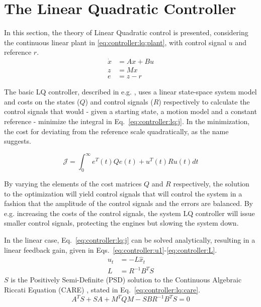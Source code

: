 \section{The Linear Quadratic Controller}
\label{sec:controller:lq}
    In this section, the theory of Linear Quadratic control is presented,
    considering the continuous linear plant in \eqref{eq:controller:lq:plant},
    with control signal $u$ and reference $r$.
    \begin{subequations}
        \label{eq:controller:lq:plant}
        \begin{align}
            \dot{x} &= Ax + Bu \\
%
            z &= Mx \\
%
            e &= z - r
        \end{align}
    \end{subequations}

    The basic LQ controller, described in e.g. \citep{glad2003reglerteori},
    uses a linear state-space system model and costs on the states ($Q$) and control
    signals ($R$) respectively to calculate the control signals that would
    - given a starting state, a motion model and a constant reference -
    minimize the integral in Eq.~\eqref{eq:controller:lq:j}.
    In the minimization, the cost for deviating from the reference scale
    quadratically, as the name suggests.

    \begin{equation}
    \label{eq:controller:lq:j}
        \mathcal{J} = \int_{0}^{\infty} e^{T}(t)Qe(t) + u^{T}(t)Ru(t) dt
    \end{equation}

    By varying the elements of the cost matrices $Q$ and $R$
    respectively, the solution to the optimization will yield control
    signals that will control the system in a fashion that the amplitude
    of the control signals and the errors are balanced.
    By e.g. increasing the costs of the control signals, the system
    LQ controller will issue smaller control signals, protecting the
    engines but slowing the system down.

    In the linear case, Eq.~\eqref{eq:controller:lq:j} can be solved analytically,
    resulting in a linear feedback gain, given in Eqs.~\eqref{eq:controller:u1}-\eqref{eq:controller:L}.
    \begin{align}
        u_{t} &= -L\hat{x}_{t} \label{eq:controller:u1} \\
%
        L &= R^{-1}B^{T}S \label{eq:controller:L}
    \end{align}
    $S$ is the Positively Semi-Definite (PSD) solution to the
    Continuous Algebraic Riccati Equation (CARE) \citep{glad2003reglerteori},
    stated in Eq.~\eqref{eq:controller:lq:care}.
    \begin{equation}
        \label{eq:controller:lq:care}
        A^{T}S + SA + M^{T}QM - SBR^{-1}B^{T}S = 0
    \end{equation}

